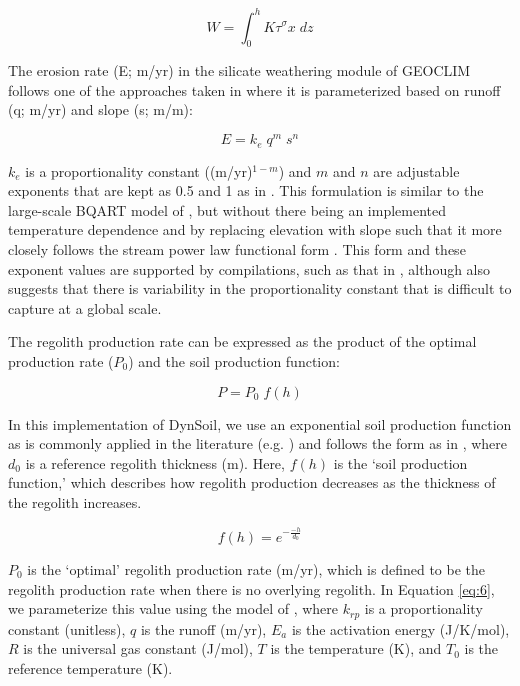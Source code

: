 \documentclass[11pt,letterpaper]{article}
\begin{document}
\begin{equation}
    W = \int_{0}^{h} K \tau^{\sigma} x\;dz
    \label{eq:4}
\end{equation}

The erosion rate (E; m/yr) in the silicate weathering module of GEOCLIM follows one of the approaches taken in \citet{Maffre2018a} where it is parameterized based on runoff (q; m/yr) and slope (s; m/m):

\begin{equation}
    E = k_{e}\;q^{m}\;s^{n}
    \label{eq:9}
\end{equation}

$k_{e}$ is a proportionality constant ((m/yr)$^{1-m}$) and $m$ and $n$ are adjustable exponents that are kept as 0.5 and 1 as in \citet{Maffre2018a}. This formulation is similar to the large-scale BQART model of \citet{Syvitski2007a}, but without there being an implemented temperature dependence and by replacing elevation with slope such that it more closely follows the stream power law functional form \citep{Davy2000a}. This form and these exponent values are supported by compilations, such as that in \citet{Lague2014a}, although \citet{Lague2014a} also suggests that there is variability in the proportionality constant that is difficult to capture at a global scale.

The regolith production rate can be expressed as the product of the optimal production rate ($P_{0}$) and the soil production function:

\begin{equation}
    P = P_{0}\;f(h)
    \label{eq:5}
\end{equation}

In this implementation of DynSoil, we use an exponential soil production function as is commonly applied in the literature (e.g. \citealp{Gabet2009a}) and follows the form as in \citet{Heimsath1997a}, where $d_{0}$ is a reference regolith thickness (m). Here, $f(h)$ is the `soil production function,' which describes how regolith production decreases as the thickness of the regolith increases.

\begin{equation}
    f(h) = e^{-\frac{-h}{d_{0}}}
    \label{eq:7}
\end{equation}

$P_{0}$ is the `optimal' regolith production rate (m/yr), which is defined to be the regolith production rate when there is no overlying regolith. In Equation \ref{eq:6}, we parameterize this value using the model of \citet{Carretier2014a}, where $k_{rp}$ is a proportionality constant (unitless), $q$ is the runoff (m/yr), $E_{a}$ is the activation energy (J/K/mol), $R$ is the universal gas constant (J/mol), $T$ is the temperature (K), and $T_{0}$ is the reference temperature (K).
\end{document}
